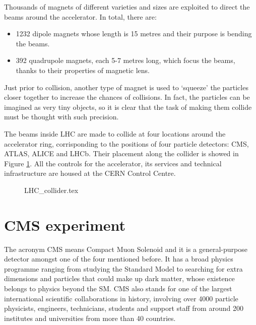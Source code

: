Thousands of magnets of different varieties and sizes are exploited to direct the beams around the accelerator. In total, there are\footnotemark:
\begin{itemize}
	\item 1232 dipole magnets whose length is 15 metres and their purpose is bending the beams.
	\item 392 quadrupole magnets, each 5-7 metres long, which focus the beams, thanks to their properties of magnetic lens.
\end{itemize}
Just prior to collision, another type of magnet is used to `squeeze' the particles closer together to increase the chances of collisions. In fact, the particles can be imagined as very tiny objects, so it is clear that the task of making them collide must be thought with such precision.

The beams inside LHC are made to collide at four locations around the accelerator ring, corrisponding to the positions of four particle detectors: CMS, ATLAS, ALICE and LHCb. Their placement along the collider is showed in Figure \ref{fig:LHC_COLLIDER}. All the controls for the accelerator, its services and technical infrastructure are housed at the CERN Control Centre.

\begin{figure}[t]
	\centering
	{LHC_collider.tex}
	\label{fig:LHC_COLLIDER}
\end{figure}





\section{CMS experiment}
The acronym CMS means Compact Muon Solenoid and it is a general-purpose detector amongst one of the four mentioned before. It has a broad physics programme ranging from studying the Standard Model to searching for extra dimensions and particles that could make up dark matter, whose existence belongs to physics beyond the SM. CMS also stands for one of the largest international scientific collaborations in history, involving over 4000 particle physicists, engineers, technicians, students and support staff from around 200 institutes and universities from more than 40 countries.

